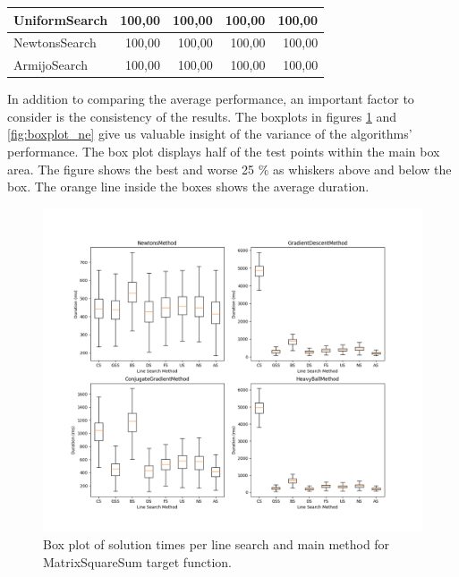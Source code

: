 \documentclass[a4paper,english,titlepage,12pt]{article}
\begin{document}
\begin{table}[H]
\begin{tabular}{|l|r|r|r|r|}
    UniformSearch                                                             & 100,00                                                   & 100,00                                                    & 100,00                                                    & 100,00                                                    \\ \hline
    NewtonsSearch                                                             & 100,00                                                   & 100,00                                                    & 100,00                                                    & 100,00                                                    \\ \hline
    ArmijoSearch                                                              & 100,00                                                   & 100,00                                                    & 100,00                                                    & 100,00                                                    \\ \hline
    \end{tabular}
\end{table}


In addition to comparing the average performance, an important factor to consider is the consistency of the results. The boxplots in figures \ref{fig:boxplot_mss} and \ref{fig:boxplot_ne} give us valuable insight of the variance of the algorithms' performance. The box plot displays half of the test points within the main box area. The figure shows the best and worse 25 \% as whiskers above and below the box. The orange line inside the boxes shows the average duration.


\begin{figure}[H]
	\centering
	\includegraphics[width=1.0\textwidth]{images/boxplot_mss.png}
	\caption{Box plot of solution times per line search and main method for MatrixSquareSum target function.}
	\label{fig:boxplot_mss}
\end{figure}
\end{document}
